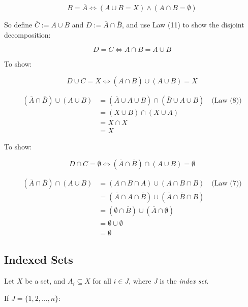 \[
	B = \overline{A} \iff (A \cup B = X) \land (A \cap B = \emptyset)
\]

So define \( \overline{C} := A \cup B \) and \( D := \overline{A} \cap \overline{B} \),
and use Law (11) to show the disjoint decomposition:

\[
	D = C \iff A \cap B = A \cup B
\]

To show:

\[
	D \cup C = X \iff (\overline{A} \cap \overline{B}) \cup (A \cup B) = X
\]

\begin{align*}
	(\overline{A} \cap \overline{B}) \cup (A \cup B)
	 & = (\overline{A} \cup A \cup B) \cap (\overline{B} \cup A \cup B) \quad \text{(Law (8))} \\
	 & = (X \cup B) \cap (X \cup A)                                                            \\
	 & = X \cap X                                                                              \\
	 & = X
\end{align*}

To show:

\[
	D \cap C = \emptyset \iff (\overline{A} \cap \overline{B}) \cap (A \cup B) = \emptyset
\]

\begin{align*}
	(\overline{A} \cap \overline{B}) \cap (A \cup B)
	 & = (A \cap B \cap A) \cup (A \cap B \cap B) \quad \text{(Law (7))}                      \\
	 & = (\overline{A} \cap A \cap \overline{B}) \cup (\overline{A} \cap \overline{B} \cap B) \\
	 & = (\emptyset \cap \overline{B}) \cup (\overline{A} \cap \emptyset)                     \\
	 & = \emptyset \cup \emptyset                                                             \\
	 & = \emptyset
\end{align*}

\QED

\subsection{Indexed Sets}

Let \(X\) be a set, and \( A_i \subseteq X \) for all \( i \in J \), where \emph{J} is the 
\emph{index set}.
\vspace{\baselineskip}

If \( J = \{1, 2, \dots, n\} \):


